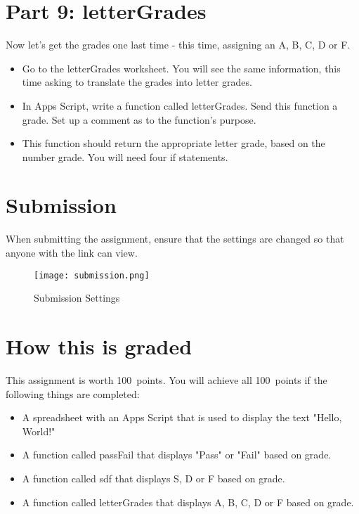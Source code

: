 \documentclass{article}
\newcommand{\AValue}{100}
\begin{document}
\section*{Part 9: letterGrades}
Now let's get the grades one last time - this time, assigning an A, B, C, D or F.
\begin{itemize}
	\item Go to the letterGrades worksheet.  You will see the same information, this time asking to translate the grades into letter grades.  
	\item In Apps Script, write a function called letterGrades.  Send this function a grade.  Set up a comment as to the function's purpose.  
	\item This function should return the appropriate letter grade, based on the number grade.  You will need four if statements.
\end{itemize}

\section*{Submission}
When submitting the assignment, ensure that the settings are changed so that anyone with the link can view.
\begin{figure}[H]
  \centering
  \texttt{[image: submission.png]}
  \caption{Submission Settings}
\end{figure}

\section*{How this is graded}
This assignment is worth \AValue \ points. You will achieve all \AValue \   points if the following things are completed:
\begin{itemize}
    \item A spreadsheet with an Apps Script that is used to display the text "Hello, World!"
    \item A function called passFail that displays "Pass" or "Fail" based on grade.
    \item A function called sdf that displays S, D or F based on grade.
    \item A function called letterGrades that displays A, B, C, D or F based on grade.
\end{itemize}
\end{document}
